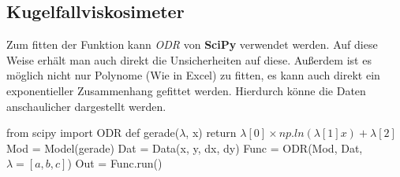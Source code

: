 \documentclass[a4paper,12pt]{article}
\begin{document}
\subsection{Kugelfallviskosimeter}
Zum fitten der Funktion kann \textit{ODR} von \textbf{SciPy} verwendet werden. Auf diese Weise erhält man auch direkt die Unsicherheiten auf diese. Außerdem ist es möglich nicht nur Polynome (Wie in Excel) zu fitten, es kann auch direkt ein exponentieller Zusammenhang gefittet werden. Hierdurch könne die Daten anschaulicher dargestellt werden.
\begin{center}
\begin{tcolorbox}[colback=gray!20, colframe=black, width=1\textwidth, boxrule=1pt, arc=1mm]
from scipy import ODR \newline
def gerade($\lambda$, x) \newline
\hspace*{1cm} return $\lambda[0] \times np.ln(\lambda[1]x) + \lambda[2]$ \newline
Mod = Model(gerade) \newline
Dat = Data(x, y, dx, dy) \newline
Func = ODR(Mod, Dat, $\lambda=[a, b, c]$) \newline
Out = Func.run()
\end{tcolorbox}
\end{center}
\end{document}
